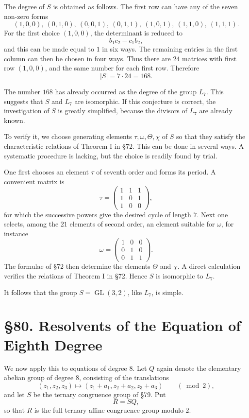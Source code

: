 \documentclass[11pt,a4paper]{book}
\newcommand{\webersection}[2]{\clearpage\section*{\S #1. #2}}
\DeclareMathOperator{\GL}{GL}
\begin{document}
The degree of \(S\) is obtained as follows.  The first row can have any of the seven non-zero forms
\[
 (1,0,0),\ (0,1,0),\ (0,0,1),\ (0,1,1),\ (1,0,1),\ (1,1,0),\ (1,1,1).
\]
For the first choice \((1,0,0)\), the determinant is reduced to
\[
 b_1c_2-c_1b_2,
\]
and this can be made equal to \(1\) in six ways.  The remaining entries in the first column can then be chosen in four ways.  Thus there are \(24\) matrices with first row \((1,0,0)\), and the same number for each first row.  Therefore
\[
 |S|=7\cdot24=168.
\]

The number \(168\) has already occurred as the degree of the group \(L_7\).  This suggests that \(S\) and \(L_7\) are isomorphic.  If this conjecture is correct, the investigation of \(S\) is greatly simplified, because the divisors of \(L_7\) are already known.

To verify it, we choose generating elements \(\tau,\omega,\Theta,\chi\) of \(S\) so that they satisfy the characteristic relations of Theorem I in \S 72.  This can be done in several ways.  A systematic procedure is lacking, but the choice is readily found by trial.

One first chooses an element \(\tau\) of seventh order and forms its period.  A convenient matrix is
\[
 \tau=
 \begin{pmatrix}
 1&1&1\\
 1&0&1\\
 1&0&0
 \end{pmatrix},
\]
for which the successive powers give the desired cycle of length \(7\).  Next one selects, among the \(21\) elements of second order, an element suitable for \(\omega\), for instance
\[
 \omega=
 \begin{pmatrix}
 1&0&0\\
 0&1&0\\
 0&1&1
 \end{pmatrix}.
\]
The formulae of \S 72 then determine the elements \(\Theta\) and \(\chi\).  A direct calculation verifies the relations of Theorem I in \S 72.  Hence \(S\) is isomorphic to \(L_7\).

It follows that the group \(S=\GL(3,2)\), like \(L_7\), is simple.

\webersection{80}{Resolvents of the Equation of Eighth Degree}

We now apply this to equations of degree \(8\).  Let \(Q\) again denote the elementary abelian group of degree \(8\), consisting of the translations
\[
 (z_1,z_2,z_3)\longmapsto(z_1+a_1,z_2+a_2,z_3+a_3)
 \qquad(\bmod 2),
\]
and let \(S\) be the ternary congruence group of \S 79.  Put
\[
 R=SQ,
\]
so that \(R\) is the full ternary affine congruence group modulo \(2\).
\end{document}
